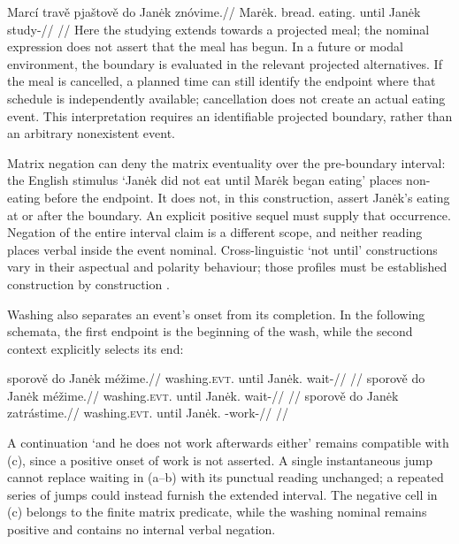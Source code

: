 \ex\label{ex:temporal-endpoint}%
\begingl
\gla Marcí travě pjaštově do Janėk znóvime.//
\glb Marėk.\Ind{} bread.\Ind{} eating.\Ind{} until Janėk study-\Prog{}//
\glft {}
//
\endgl
\xe
Here the studying extends towards a projected meal; the nominal expression does
not assert that the meal has begun. In a future or modal environment, the
boundary is evaluated in the relevant projected alternatives. If the meal is
cancelled, a planned time can still identify the endpoint where that schedule
is independently available; cancellation does not create an actual eating
event. This interpretation requires an identifiable projected boundary, rather
than an arbitrary nonexistent event.

Matrix negation can deny the matrix eventuality over the pre-boundary
interval: the English stimulus `Janėk did not eat until Marėk began eating'
places non-eating before the endpoint. It does not, in this construction,
assert Janėk's eating at or after the boundary. An explicit positive sequel
must supply that occurrence. Negation of the entire interval claim is a
different scope, and neither reading places verbal  inside the event
nominal. Cross-linguistic `not until' constructions vary in their aspectual and
polarity behaviour; those profiles must be established construction by
construction \cite[§§1--2]{deswarttellingswalchli2022}.

Washing also separates an event's onset from its completion. In the
following schemata, the first endpoint is the beginning of the wash, while
the second context explicitly selects its end:

\pex\label{ex:slot-endpoint-boundaries}
\a
\begingl
\gla sporově do Janėk méžime.//
\glb washing.\textsc{evt}.\Ind{} until Janėk.\Dir{} wait-\Prog{}//
\glft {}
//
\endgl
\a
\begingl
\gla sporově do Janėk méžime.//
\glb washing.\textsc{evt}.\Ind{} until Janėk.\Dir{} wait-\Prog{}//
\glft {}
//
\endgl
\a
\begingl
\gla sporově do Janėk zatrástime.//
\glb washing.\textsc{evt}.\Ind{} until Janėk.\Dir{} \Neg{}-work-\Prog{}//
\glft {}
//
\endgl
\xe

A continuation `and he does not work afterwards either' remains
compatible with (c), since a positive onset of work is not asserted. A single
instantaneous jump cannot replace waiting in (a--b) with its punctual reading
unchanged; a repeated series of jumps could instead furnish the extended
interval. The negative cell in (c) belongs to the finite matrix predicate,
while the washing nominal remains positive and contains no internal verbal
negation.


